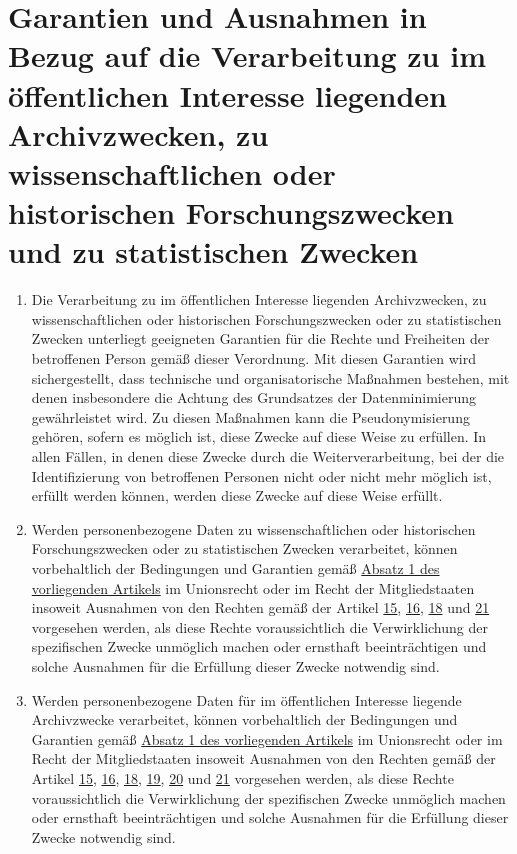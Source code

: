 \chapter{Garantien und Ausnahmen in Bezug auf die Verarbeitung zu im öffentlichen Interesse liegenden Archivzwecken, zu
 wissenschaftlichen oder historischen Forschungszwecken und zu statistischen Zwecken}
\label{ch:89}


\begin{enumerate}

  \item Die Verarbeitung zu im öffentlichen Interesse liegenden Archivzwecken, zu wissenschaftlichen oder historischen
   Forschungszwecken oder zu statistischen Zwecken unterliegt geeigneten Garantien für die Rechte und Freiheiten der
   betroffenen Person gemäß dieser Verordnung. Mit diesen Garantien wird sichergestellt, dass technische und
   organisatorische Maßnahmen bestehen, mit denen insbesondere die Achtung des Grundsatzes der Datenminimierung
   gewährleistet wird. Zu diesen Maßnahmen kann die Pseudonymisierung gehören, sofern es möglich ist, diese Zwecke auf
   diese Weise zu erfüllen. In allen Fällen, in denen diese Zwecke durch die Weiterverarbeitung, bei der die
   Identifizierung von betroffenen Personen nicht oder nicht mehr möglich ist, erfüllt werden können, werden diese
   Zwecke auf diese Weise erfüllt.
  \label{itm:89-1}

  \item Werden personenbezogene Daten zu wissenschaftlichen oder historischen Forschungszwecken oder zu statistischen
   Zwecken verarbeitet, können vorbehaltlich der Bedingungen und Garantien gemäß \hyperref[itm:89-1]{Absatz 1 des
   vorliegenden Artikels} im Unionsrecht oder im Recht der Mitgliedstaaten insoweit Ausnahmen von den Rechten gemäß der
   Artikel \hyperref[ch:15]{15}, \hyperref[ch:16]{16}, \hyperref[ch:18]{18} und \hyperref[ch:21]{21} vorgesehen werden,
   als diese Rechte voraussichtlich die Verwirklichung der spezifischen Zwecke unmöglich machen oder ernsthaft
   beeinträchtigen und solche Ausnahmen für die Erfüllung dieser Zwecke notwendig sind.
  \label{itm:89-2}

  \item Werden personenbezogene Daten für im öffentlichen Interesse liegende Archivzwecke verarbeitet, können
   vorbehaltlich der Bedingungen und Garantien gemäß \hyperref[itm:89-1]{Absatz 1 des vorliegenden Artikels} im
   Unionsrecht oder im Recht der Mitgliedstaaten insoweit Ausnahmen von den Rechten gemäß der Artikel \hyperref[ch:15]
   {15}, \hyperref[ch:16]{16}, \hyperref[ch:18]{18}, \hyperref[ch:19]{19}, \hyperref[ch:20]{20} und \hyperref[ch:21]
   {21} vorgesehen werden, als diese Rechte voraussichtlich die Verwirklichung der spezifischen Zwecke unmöglich machen
   oder ernsthaft beeinträchtigen und solche Ausnahmen für die Erfüllung dieser Zwecke notwendig sind.
  \label{itm:89-3}


\end{enumerate}
